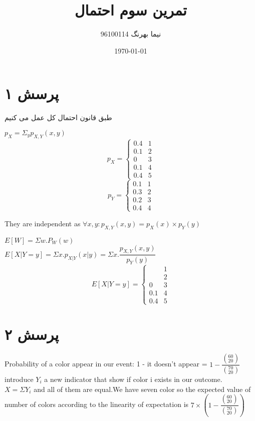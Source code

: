 \documentclass[a4paper]{article}
\title{تمرین سوم احتمال}
\author{نیما بهرنگ 96100114}
\date{\today}
\begin{document}
\maketitle
{}

\section*{پرسش ۱}
طبق قانون احتمال کل عمل می کنیم
\begin{enumerate}
\begin{latin}
\item{}
$ p_X =\Sigma_y p_{X,Y}(x,y)$
\[
  p_X=\begin{cases}
               0.4 & 1\\
               0.1 & 2\\
0  & 3\\
0.1 & 4\\
0.4 & 5				
            \end{cases}
\]
\[
  p_Y=\begin{cases}
               0.1 & 1\\
               0.3 & 2\\
0.2  & 3\\
0.4 & 4
            \end{cases}
\]
\item{}
They are independent as $ \forall x,y:  p_{X,Y}(x,y) = p_X(x)\times p_Y(y)$\\
\item{}
$E[W] = \Sigma w.P_W(w)$\\
$E[X|Y=y]=\Sigma x.p_{X|Y}(x|y)=\Sigma x.\dfrac{p_{X,Y}(x,y)}{p_Y(y)}$\\
\[
  E[X|Y=y] =\begin{cases}
& 1\\
& 2\\
0  & 3\\
0.1 & 4\\
0.4 & 5				
            \end{cases}
\]


\end{latin}
\end{enumerate}
\pagebreak
\section*{پرسش ۲}
\begin{latin}
Probability of a color appear in our event: 1 - it doesn't appear = $1 - \dfrac{(^{60}_{20})}{(^{70}_{20})}$\\
introduce $Y_i$ a new indicator that show if color i exists in our outcome.\\
$X=\Sigma Y_i$ and all of them are equal.We have seven color so the expected value of number of colors according to the linearity of expectation is $7\times (1 - \dfrac{(^{60}_{20})}{(^{70}_{20})})$

\end{latin}
\pagebreak
\end{document}
